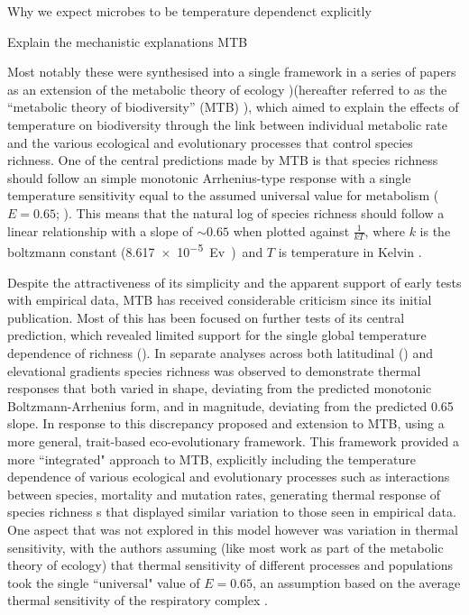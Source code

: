 \documentclass{article}
\begin{document}
Why we expect microbes to be temperature dependenct explicitly 

Explain the mechanistic explanations 
 MTB
 
 
 Most notably these were synthesised into a single framework in a series of papers as an extension of the metabolic theory of ecology \citep{Allen2002,Allen2006,Gillooly2007})(hereafter referred to as the ``metabolic theory of biodiversity'' (MTB) \citep{Stegen2012}), which aimed to explain the effects of temperature on biodiversity through the link between individual metabolic rate and the various ecological and evolutionary processes that control species richness. One of the central predictions made by MTB is that species richness should follow an simple monotonic Arrhenius-type response with a single temperature sensitivity equal to the assumed universal value for metabolism ($E = 0.65$; \cite{Gillooly2001}). This means that the natural log of species richness should follow a linear relationship with a slope of $\sim 0.65$ when plotted against $\frac{1}{kT}$, where $k$ is the boltzmann constant (\SI{8.617e-5}Ev) and $T$ is temperature in Kelvin \citep{Allen2002}.

Despite the attractiveness of its simplicity and the apparent support of early tests with empirical data, MTB has received considerable criticism since its initial publication. Most of this has been focused on further tests of its central prediction, which revealed limited support for the single global temperature dependence of richness (\citep{Hawkins2007}). In separate analyses across both latitudinal (\citep{Hawkins2007,Algar2007}) and elevational \citep{McCain2010} gradients species richness was observed to demonstrate thermal responses that both varied in shape, deviating from the predicted monotonic Boltzmann-Arrhenius form, and in magnitude, deviating from the predicted 0.65 slope. In response to this discrepancy \citet{Stegen2012} proposed and extension to MTB, using a more general, trait-based eco-evolutionary framework. This framework provided a more ``integrated" approach to MTB, explicitly including the temperature dependence of various ecological and evolutionary processes such as interactions between species, mortality and mutation rates, generating thermal response of species richness s that displayed similar variation to those seen in empirical data. One aspect that was not explored in this model however was variation in thermal sensitivity, with the authors assuming (like most work as part of the metabolic theory of ecology) that thermal sensitivity of different processes and populations took the single ``universal" value of $E=0.65$, an assumption based on the average thermal sensitivity of the respiratory complex \citep{Gillooly2001,Brown2004}.
\end{document}

